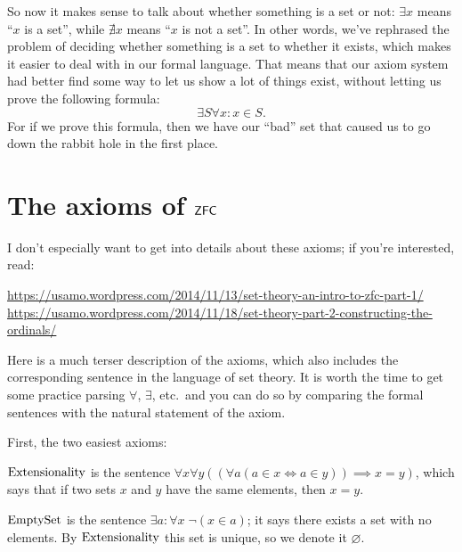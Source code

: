 So now it makes sense to talk about whether something is a set or not:
$\exists x$ means ``$x$ is a set'', while $\nexists x$ means ``$x$ is not a set''.
In other words, we've rephrased the problem of deciding whether something
is a set to whether it exists,
which makes it easier to deal with in our formal language.
That means that our axiom system had better find some way to let us
show a lot of things exist, without letting us prove the following formula:
\[ \exists S \forall x : x \in S. \]
For if we prove this formula,
then we have our ``bad'' set that caused us to go down the
rabbit hole in the first place.


\section{The axioms of $\mathsf{ZFC}$}
I don't especially want to get into details about these axioms;
if you're interested, read:
\begin{itemize}
	\ii \footnotesize \url{https://usamo.wordpress.com/2014/11/13/set-theory-an-intro-to-zfc-part-1/}
	\ii \footnotesize \url{https://usamo.wordpress.com/2014/11/18/set-theory-part-2-constructing-the-ordinals/}
\end{itemize}
Here is a much terser description of the axioms,
which also includes the corresponding sentence in the language of set theory.
It is worth the time to get some practice parsing $\forall$, $\exists$, etc.\
and you can do so by comparing the formal sentences with the natural statement of the axiom.

First, the two easiest axioms:
\begin{itemize}
	\ii $\mathrm{Extensionality}$ is the sentence
	$\forall x \forall y
	\left( \left( \forall a  \left( a \in x \iff a \in y \right) \right)
	\implies x = y \right)$,
	which says that if two sets $x$ and $y$ have the same elements,
	then $x = y$.

	\ii $\mathrm{EmptySet}$ is the sentence $\exists a : \forall x \; \neg (x \in a)$;
	it says there exists a set with no elements.
	By $\mathrm{Extensionality}$ this set is unique, so we denote it $\varnothing$.
\end{itemize}

